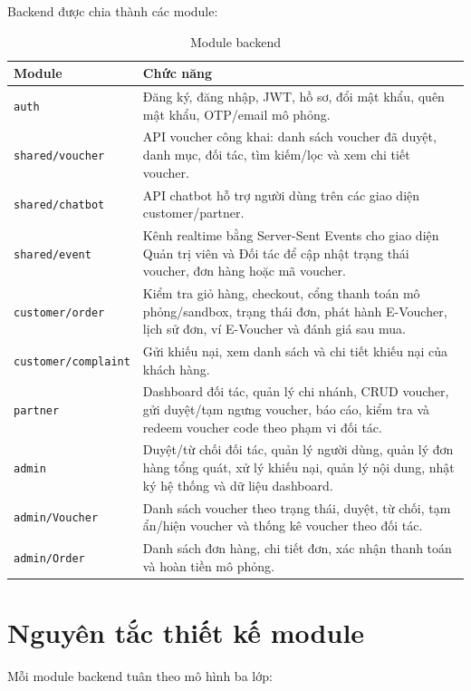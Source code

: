 Backend được chia thành các module:

\begin{table}[H]
\centering
\small
\begin{tabularx}{\textwidth}{|p{3.6cm}|Y|}
\hline
\textbf{Module} & \textbf{Chức năng} \\ \hline
\texttt{auth} & Đăng ký, đăng nhập, JWT, hồ sơ, đổi mật khẩu, quên mật khẩu, OTP/email mô phỏng. \\ \hline
\texttt{shared/voucher} & API voucher công khai: danh sách voucher đã duyệt, danh mục, đối tác, tìm kiếm/lọc và xem chi tiết voucher. \\ \hline
\texttt{shared/chatbot} & API chatbot hỗ trợ người dùng trên các giao diện customer/partner. \\ \hline
\texttt{shared/event} & Kênh realtime bằng Server-Sent Events cho giao diện Quản trị viên và Đối tác để cập nhật trạng thái voucher, đơn hàng hoặc mã voucher. \\ \hline
\texttt{customer/order} & Kiểm tra giỏ hàng, checkout, cổng thanh toán mô phỏng/sandbox, trạng thái đơn, phát hành E-Voucher, lịch sử đơn, ví E-Voucher và đánh giá sau mua. \\ \hline
\texttt{customer/complaint} & Gửi khiếu nại, xem danh sách và chi tiết khiếu nại của khách hàng. \\ \hline
\texttt{partner} & Dashboard đối tác, quản lý chi nhánh, CRUD voucher, gửi duyệt/tạm ngưng voucher, báo cáo, kiểm tra và redeem voucher code theo phạm vi đối tác. \\ \hline
\texttt{admin} & Duyệt/từ chối đối tác, quản lý người dùng, quản lý đơn hàng tổng quát, xử lý khiếu nại, quản lý nội dung, nhật ký hệ thống và dữ liệu dashboard. \\ \hline
\texttt{admin/Voucher} & Danh sách voucher theo trạng thái, duyệt, từ chối, tạm ẩn/hiện voucher và thống kê voucher theo đối tác. \\ \hline
\texttt{admin/Order} & Danh sách đơn hàng, chi tiết đơn, xác nhận thanh toán và hoàn tiền mô phỏng. \\ \hline
\end{tabularx}
\caption{Module backend}
\end{table}

\section{Nguyên tắc thiết kế module}

Mỗi module backend tuân theo mô hình ba lớp:

